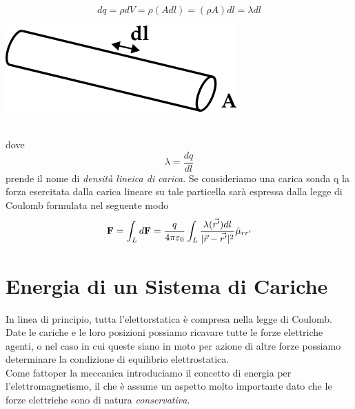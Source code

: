 \begin{minipage}{0.6\textwidth}
\begin{equation*}
dq = \rho dV = \rho (Adl) = (\rho A)dl = \lambda dl
\end{equation*}
\end{minipage}
\begin{minipage}{0.3\textwidth}
\centering
\includegraphics[width=\textwidth]{images/lineica.png}
\end{minipage}
\\
dove 
\begin{equation*}
	\lambda = \frac{dq}{dl}
\end{equation*}
prende il nome di \textit{densit\`a lineica di carica}. Se consideriamo una carica sonda q la forza esercitata dalla carica lineare su tale particella sar\`a espressa dalla legge di Coulomb formulata nel seguente modo
\begin{equation*}
	\bold{F} = \int_{L} d\bold{F} = \frac{q}{4 \pi \varepsilon_0} \int_{L} \frac{\lambda(\vec{r'})dl}{|\vec{r} - \vec{r'}|^2} \hat{\mu}_{rr'}
\end{equation*}

\section{Energia di un Sistema di Cariche}

In linea di principio, tutta l'elettorstatica \`e compresa nella legge di Coulomb. Date le cariche e le loro posizioni possiamo ricavare tutte le forze elettriche agenti, o nel caso in cui queste siano in moto per azione di altre forze possiamo determinare la condizione di equilibrio elettrostatica.
\\
Come fattoper la meccanica introduciamo il concetto di energia per l'elettromagnetismo, il che \`e assume un aspetto molto importante dato che le forze elettriche sono di natura \textit{conservativa}.
\\

